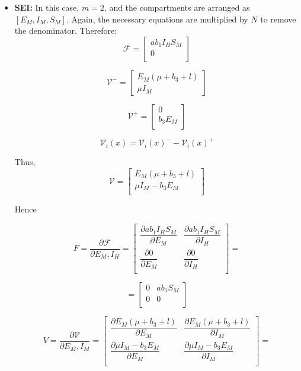 \documentclass[a4paper,fleqn]{cas-dc}
\begin{document}
\begin{itemize}
\item \textbf{SEI:}
In this case, $m=2$, and the compartments are arranged as $[E_M, I_M, S_M]$. Again, the necessary equations are multiplied by $N$ to remove the denominator. Therefore:
$$ {\mathcal F} =\begin{bmatrix}
a b_1 I_H S_M\\
0\\
\end{bmatrix} $$

$$
{\mathcal V^-} = \begin{bmatrix}
E_M (\mu + b_3 + l)\\
\mu I_M
\end{bmatrix}
$$

$$
{\mathcal V^+} = \begin{bmatrix}
0\\
b_3 E_M\\
\end{bmatrix}
$$

$${\mathcal V}_i (x) = {\mathcal V}_i(x)^{-} - {\mathcal V}_i(x)^+$$

Thus,
$$
{\mathcal V} =
\begin{bmatrix}
E_M (\mu + b_3 + l)\\
\mu I_M - b_3 E_M\\
\end{bmatrix}
$$

Hence

$$ F = \dfrac{\partial{\mathcal F}}{\partial E_M, I_H} =
\begin{bmatrix}
\dfrac{\partial ab_1 I_H S_M}{\partial E_M} & \dfrac{\partial ab_1 I_H S_M}{\partial I_H}\\
\dfrac{\partial 0}{\partial E_M} & \dfrac{\partial 0}{\partial I_H}\\
\end{bmatrix} = 
$$

$$
= \begin{bmatrix}
0 & ab_1 S_M\\
0 & 0\\
\end{bmatrix}$$

$$ V = \dfrac{\partial{\mathcal V}}{\partial E_M, I_M} =
\begin{bmatrix}
\dfrac{\partial E_M (\mu + b_3 + l)}{\partial E_M} & \dfrac{\partial E_M (\mu + b_3 + l)}{\partial I_M}\\
\dfrac{\partial \mu I_M - b_3 E_M}{\partial E_M} & \dfrac{\partial \mu I_M - b_3 E_M}{\partial I_M}\\
\end{bmatrix} = 
$$


\end{itemize}
\end{document}
